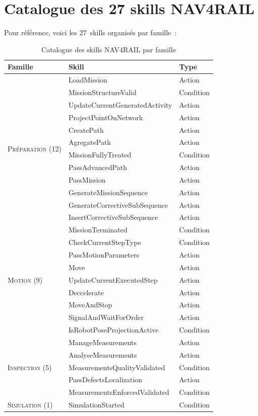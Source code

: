\documentclass[a4paper,11pt]{article}
\begin{document}
\section{Catalogue des 27 skills NAV4RAIL}
\label{sec:skills}

Pour référence, voici les 27~skills organisés par famille~:

\begin{table}[H]
\centering
\caption{Catalogue des skills NAV4RAIL par famille}
\small
\begin{tabular}{@{}l l l@{}}
\toprule
\textbf{Famille} & \textbf{Skill} & \textbf{Type} \\
\midrule
\multirow{12}{*}{\textsc{Préparation} (12)} & LoadMission & Action \\
 & MissionStructureValid & Condition \\
 & UpdateCurrentGeneratedActivity & Action \\
 & ProjectPointOnNetwork & Action \\
 & CreatePath & Action \\
 & AgregatePath & Action \\
 & MissionFullyTreated & Condition \\
 & PassAdvancedPath & Action \\
 & PassMission & Action \\
 & GenerateMissionSequence & Action \\
 & GenerateCorrectiveSubSequence & Action \\
 & InsertCorrectiveSubSequence & Action \\
\midrule
\multirow{9}{*}{\textsc{Motion} (9)} & MissionTerminated & Condition \\
 & CheckCurrentStepType & Condition \\
 & PassMotionParameters & Action \\
 & Move & Action \\
 & UpdateCurrentExecutedStep & Action \\
 & Deccelerate & Action \\
 & MoveAndStop & Action \\
 & SignalAndWaitForOrder & Action \\
 & IsRobotPoseProjectionActive & Condition \\
\midrule
\multirow{5}{*}{\textsc{Inspection} (5)} & ManageMeasurements & Action \\
 & AnalyseMeasurements & Action \\
 & MeasurementsQualityValidated & Condition \\
 & PassDefectsLocalization & Action \\
 & MeasurementsEnforcedValidated & Condition \\
\midrule
\textsc{Simulation} (1) & SimulationStarted & Condition \\
\bottomrule
\end{tabular}
\end{table}
\end{document}
